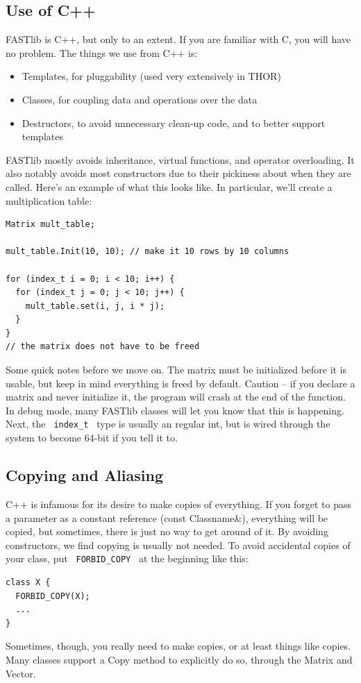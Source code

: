 \documentclass[letter]{report}
\begin{document}
\subsection{Use of C++}

FASTlib is C++, but only to an extent. If you are familiar with C, you will have no problem. The things we use from C++ is:
\begin{itemize}
\item Templates, for pluggability (used very extensively in THOR)
\item Classes, for coupling data and operations over the data
\item Destructors, to avoid unnecessary clean-up code, and to better support templates 
\end{itemize}
FASTlib mostly avoids inheritance, virtual functions, and operator overloading. It also notably avoids most constructors due to their pickiness about when they are called. Here's an example of what this looks like. In particular, we'll create a multiplication table:
\begin{verbatim}
Matrix mult_table;

mult_table.Init(10, 10); // make it 10 rows by 10 columns

for (index_t i = 0; i < 10; i++) {
  for (index_t j = 0; j < 10; j++) {
    mult_table.set(i, j, i * j);
  }
}
// the matrix does not have to be freed
\end{verbatim}
Some quick notes before we move on. The matrix must be initialized before it is usable, but keep in mind everything is freed by default. Caution -- if you declare a matrix and never initialize it, the program will crash at the end of the function. In debug mode, many FASTlib classes will let you know that this is happening. Next, the \verb= index_t = type is usually an regular int, but is wired through the system to become 64-bit if you tell it to.

\subsection{Copying and Aliasing}

C++ is infamous for its desire to make copies of everything. If you forget to pass a parameter as a constant reference (const Classname\&), everything will be copied, but sometimes, there is just no way to get around of it. By avoiding constructors, we find copying is usually not needed. To avoid accidental copies of your class, put \verb= FORBID_COPY = at the beginning like this:
\begin{verbatim}
class X {
  FORBID_COPY(X);
  ...
}
\end{verbatim}
Sometimes, though, you really need to make copies, or at least things like copies. Many classes support a Copy method to explicitly do so, through the Matrix and Vector.
\end{document}
